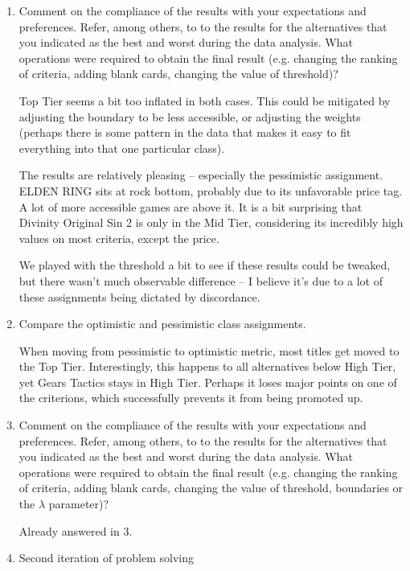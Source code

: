 \documentclass{article}
\begin{document}
\begin{enumerate}
    \item Comment on the compliance of the results with your expectations and preferences. Refer, among
    others, to to the results for the alternatives that you indicated as the best and worst during the data
    analysis. What operations were required to obtain the final result (e.g. changing the ranking of criteria,
    adding blank cards, changing the value of threshold)?

    Top Tier seems a bit too inflated in both cases. This could be
    mitigated by adjusting the boundary to be less accessible, or adjusting
    the weights (perhaps there is some pattern in the data that makes it
    easy to fit everything into that one particular class).

    The results are relatively pleasing -- especially the pessimistic
    assignment. ELDEN RING sits at rock bottom, probably due to its
    unfavorable price tag. A lot of more accessible games are above it. It
    is a bit surprising that Divinity Original Sin 2 is only in the Mid
    Tier, considering its incredibly high values on most criteria, except
    the price.

    We played with the threshold a bit to see if these results could be tweaked, but
    there wasn't much observable difference -- I believe it's due to a lot
    of these assignments being dictated by discordance.

    \item Compare the optimistic and pessimistic class assignments.

    When moving from pessimistic to optimistic metric, most titles get
    moved to the Top Tier. Interestingly, this happens to all alternatives
    below High Tier, yet Gears Tactics stays in High Tier. Perhaps it loses
    major points on one of the criterions, which successfully prevents it
    from being promoted up.

    \item Comment on the compliance of the results with your expectations and preferences. Refer, among
    others, to to the results for the alternatives that you indicated as the best and worst during the data
    analysis. What operations were required to obtain the final result (e.g. changing the ranking of criteria,
    adding blank cards, changing the value of threshold, boundaries or the $\lambda$ parameter)?

    Already answered in 3.

    \item Second iteration of problem solving


\end{enumerate}
\end{document}
